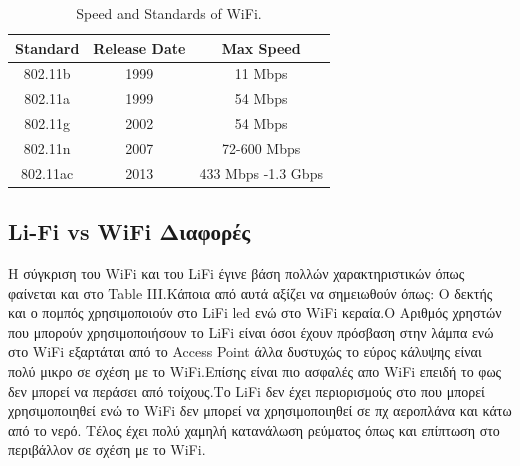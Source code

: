 \documentclass[conference]{IEEEtran}
\begin{document}
\begin{table}[H]
\large
\caption{Speed and Standards of WiFi.\cite{b9}} %
\centering %
\begin{tabular}{c c c} %
\hline\hline %
Standard & Release Date  & Max Speed  \\ [0.5ex] %
\hline %
802.11b & 1999 & 11 Mbps \\ %
802.11a & 1999 & 54 Mbps \\
802.11g & 2002 & 54 Mbps  \\
802.11n & 2007 & 72-600 Mbps  \\
802.11ac & 2013 & 433 Mbps -1.3 Gbps  \\ [1ex] %
\hline %
\end{tabular}
\label{table:nonlin} %
\end{table}

\subsection{Li-Fi vs WiFi Διαφορές}
Η σύγκριση του WiFi και του  LiFi έγινε βάση πολλών χαρακτηριστικών  όπως φαίνεται και στο Table III.Κάποια από αυτά αξίζει να σημειωθούν όπως: Ο δεκτής και  ο πομπός χρησιμοποιούν στο LiFi led ενώ στο   WiFi κεραία.Ο Αριθμός χρηστών που μπορούν χρησιμοποιήσουν το  LiFi είναι όσοι έχουν πρόσβαση στην λάμπα ενώ στο WiFi εξαρτάται από το Access Point άλλα δυστυχώς το εύρος κάλυψης είναι πολύ μικρο σε σχέση με το WiFi.Επίσης είναι πιο ασφαλές απο WiFi  επειδή το φως δεν μπορεί να περάσει από τοίχους.Το LiFi δεν έχει περιορισμούς στο που μπορεί  χρησιμοποιηθεί ενώ το WiFi δεν μπορεί να χρησιμοποιηθεί σε πχ αεροπλάνα και κάτω από το νερό. Τέλος έχει πολύ χαμηλή κατανάλωση ρεύματος όπως και επίπτωση στο περιβάλλον σε σχέση με το WiFi.
\end{document}
